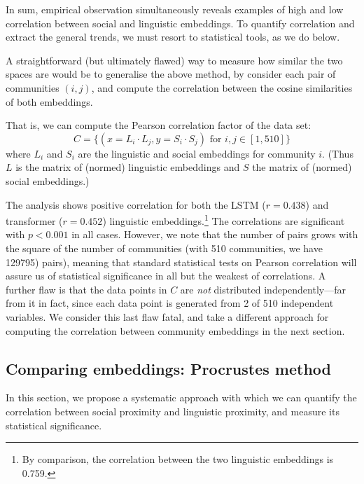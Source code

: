 \documentclass[11pt]{article}
\begin{document}
In sum, empirical observation simultaneously reveals examples of high
and low correlation between social and linguistic embeddings.  To
quantify correlation and extract the general trends, we must resort to
statistical tools, as we do below.

A straightforward (but ultimately flawed) way to measure how similar
the two spaces are would be to generalise the above method, by
consider each pair of communities \((i,j)\), and compute the
correlation between the cosine similarities of both embeddings.

That is, we can compute the Pearson correlation factor of the data set:
\[C = \{(x = L_i · L_j, y = S_i · S_j) \text {~for~} i,j ∈
  [1,510]\}\] %
where \(L_i\) and \(S_i\) are the linguistic and social embeddings for
community \(i\).  (Thus \(L\) is the matrix of (normed) linguistic
embeddings and \(S\) the matrix of (normed) social embeddings.)

The analysis shows positive correlation for both the LSTM ($r=0.438$)
and transformer ($r=0.452$) linguistic embeddings.\footnote{ By
  comparison, the correlation between the two linguistic embeddings is
  \num{0.759}.}  The correlations are significant with $p<0.001$ in
all cases.  However, we note that the number of pairs grows with the
square of the number of communities (with 510 communities, we have
129795) pairs), meaning that standard statistical tests on Pearson
correlation will assure us of statistical significance in all but the
weakest of correlations. A further flaw is that the data points in
\(C\) are \emph{not} distributed independently---far from it in fact,
since each data point is generated from \num{2} of \num{510}
independent variables. We consider this last flaw fatal, and take a
different approach for computing the correlation between community
embeddings in the next section.


\subsection{Comparing embeddings: Procrustes method}
\label{sec:statistical-evidence}


In this section, we propose a
systematic approach with which we can quantify the correlation
between social proximity and linguistic proximity, and measure its
statistical significance.
\end{document}
